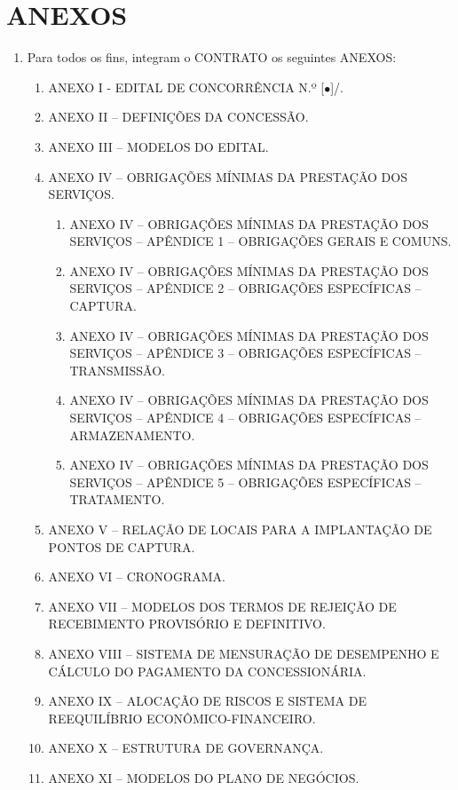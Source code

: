 \documentclass[a4paper,11pt]{report} %
\newcommand{\NumeroLicitacao}{[$\bullet$]}
\newcommand{\AnoLicitacao}{\the\year}
\begin{document}
\section{ANEXOS}
\label{sec:RML7}
\begin{enumerate}

\item \label{itm:FAGK} Para todos os fins, integram o CONTRATO os seguintes ANEXOS:

\begin{enumerate}[label*=\arabic*.]
\item \label{itm:YJ3Y} ANEXO I - EDITAL DE CONCORRÊNCIA N.º \NumeroLicitacao/\AnoLicitacao. 
\item \label{itm:DMBQ} ANEXO II – DEFINIÇÕES DA CONCESSÃO.
\item \label{itm:3NLU} ANEXO III – MODELOS DO EDITAL.
\item \label{itm:4K53} ANEXO IV – OBRIGAÇÕES MÍNIMAS DA PRESTAÇÃO DOS SERVIÇOS.

\begin{enumerate}[label*=\arabic*.]
\item \label{itm:AQMQ} ANEXO IV – OBRIGAÇÕES MÍNIMAS DA PRESTAÇÃO DOS SERVIÇOS – APÊNDICE 1 – OBRIGAÇÕES GERAIS E COMUNS.
\item \label{itm:LSCC} ANEXO IV – OBRIGAÇÕES MÍNIMAS DA PRESTAÇÃO DOS SERVIÇOS – APÊNDICE 2 – OBRIGAÇÕES ESPECÍFICAS – CAPTURA.
\item \label{itm:ELKY} ANEXO IV – OBRIGAÇÕES MÍNIMAS DA PRESTAÇÃO DOS SERVIÇOS – APÊNDICE 3 – OBRIGAÇÕES ESPECÍFICAS – TRANSMISSÃO.
\item \label{itm:CKKV} ANEXO IV – OBRIGAÇÕES MÍNIMAS DA PRESTAÇÃO DOS SERVIÇOS – APÊNDICE 4 – OBRIGAÇÕES ESPECÍFICAS – ARMAZENAMENTO.
\item \label{itm:3KD3} ANEXO IV – OBRIGAÇÕES MÍNIMAS DA PRESTAÇÃO DOS SERVIÇOS – APÊNDICE 5 – OBRIGAÇÕES ESPECÍFICAS – TRATAMENTO.
\end{enumerate}

\item \label{itm:57Z2} ANEXO V – RELAÇÃO DE LOCAIS PARA A IMPLANTAÇÃO DE PONTOS DE CAPTURA.
\item \label{itm:BT27} ANEXO VI – CRONOGRAMA.
\item \label{itm:2P3J} ANEXO VII – MODELOS DOS TERMOS DE REJEIÇÃO DE RECEBIMENTO PROVISÓRIO E DEFINITIVO.
\item \label{itm:SXAQ} ANEXO VIII – SISTEMA DE MENSURAÇÃO DE DESEMPENHO E CÁLCULO DO PAGAMENTO DA CONCESSIONÁRIA.
\item \label{itm:YTEB} ANEXO IX – ALOCAÇÃO DE RISCOS E SISTEMA DE REEQUILÍBRIO ECONÔMICO-FINANCEIRO.
\item \label{itm:KGA3} ANEXO X – ESTRUTURA DE GOVERNANÇA.
\item \label{itm:C8YR} ANEXO XI – MODELOS DO PLANO DE NEGÓCIOS.


\end{enumerate}
\end{enumerate}
\end{document}
